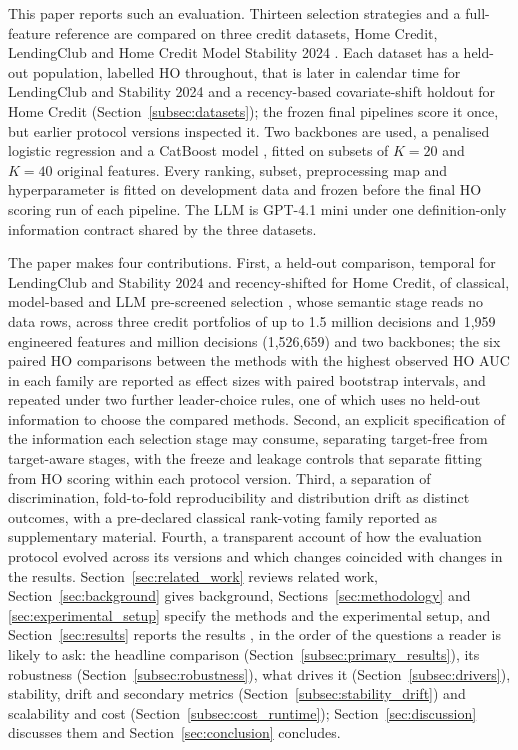 \documentclass[final,5p,twocolumn]{elsarticle}
\newcommand{\Kfeat}{K}
\providecommand{\DIFaddtex}[1]{{\protect\color{blue} \sf #1}} %
\providecommand{\DIFdeltex}[1]{{\protect\color{red} \scriptsize #1}} %
\providecommand{\DIFaddbegin}{} %
\providecommand{\DIFaddend}{} %
\providecommand{\DIFdelbegin}{} %
\providecommand{\DIFdelend}{} %
\providecommand{\DIFadd}[1]{\texorpdfstring{\DIFaddtex{#1}}{#1}} %
\providecommand{\DIFdel}[1]{\texorpdfstring{\DIFdeltex{#1}}{}} %
\begin{document}
This paper reports such an evaluation. Thirteen selection strategies and a full-feature reference are compared on three credit datasets, Home Credit, LendingClub and Home Credit Model Stability 2024 \cite{homecredit2018,lendingclub_kaggle,homecredit2024}. Each dataset has a held-out population, labelled HO throughout, that is later in calendar time for LendingClub and Stability 2024 and a recency-based covariate-shift holdout for Home Credit (Section~\ref{subsec:datasets}); the frozen final pipelines score it once, but earlier protocol versions inspected it. Two backbones are used, a penalised logistic regression and a CatBoost model \cite{prokhorenkova2018}, fitted on subsets of $\Kfeat=20$ and $\Kfeat=40$ original features. Every ranking, subset, preprocessing map and hyperparameter is fitted on development data and frozen before the final HO scoring run of each pipeline. The LLM is GPT-4.1 mini \cite{openai2025gpt41} under one definition-only information contract shared by the three datasets.

The paper makes four contributions. First, a held-out comparison, temporal for LendingClub and Stability 2024 and recency-shifted for Home Credit, of classical, model-based and LLM pre-screened selection\DIFaddbegin \DIFadd{, whose semantic stage reads no data rows, }\DIFaddend across three credit portfolios of up to \DIFdelbegin \DIFdel{1.5 million decisions and }\DIFdelend 1,959 engineered features and \DIFaddbegin \DIFadd{1.5 million decisions (1,526,659) and }\DIFaddend two backbones; the six paired HO comparisons between the methods with the highest observed HO AUC in each family are reported as effect sizes with paired bootstrap intervals, and repeated under two further leader-choice rules, one of which uses no held-out information to choose the compared methods. Second, an explicit specification of the information each selection stage may consume, separating target-free from target-aware stages, with the freeze and leakage controls that separate fitting from HO scoring within each protocol version. Third, a separation of discrimination, fold-to-fold reproducibility and distribution drift as distinct outcomes, with a pre-declared classical rank-voting family reported as supplementary material. Fourth, a transparent account of how the evaluation protocol evolved across its versions and which changes coincided with changes in the results. Section~\ref{sec:related_work} reviews related work, Section~\ref{sec:background} gives background, Sections~\ref{sec:methodology} and \ref{sec:experimental_setup} specify the methods and the experimental setup, \DIFaddbegin \DIFadd{and }\DIFaddend Section~\ref{sec:results} reports the results \DIFdelbegin \DIFdel{, }\DIFdelend \DIFaddbegin \DIFadd{in the order of the questions a reader is likely to ask: the headline comparison (Section~\ref{subsec:primary_results}), its robustness (Section~\ref{subsec:robustness}), what drives it (Section~\ref{subsec:drivers}), stability, drift and secondary metrics (Section~\ref{subsec:stability_drift}) and scalability and cost (Section~\ref{subsec:cost_runtime}); }\DIFaddend Section~\ref{sec:discussion} discusses them and Section~\ref{sec:conclusion} concludes.
\end{document}
